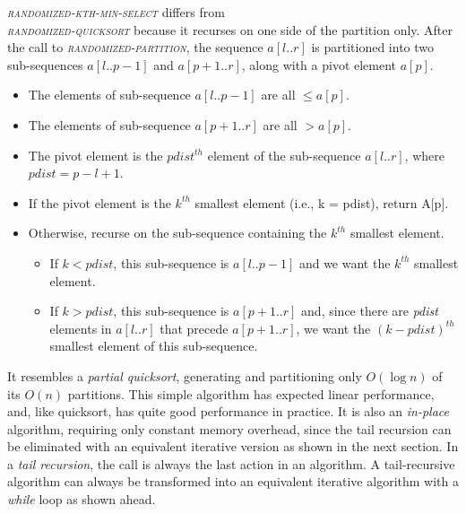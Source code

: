 \emph{\textsc{randomized-kth-min-select}} differs from\\ \emph{\textsc{randomized-quicksort}} because it recurses on one side of the partition only. After the call to \emph{\textsc{randomized-partition}}, the sequence $a[l..r]$ is partitioned into two sub-sequences $a[l..p - 1]$ and $a[p + 1..r]$, along with a pivot element $a[p]$.
\begin{itemize}
    \item The elements of sub-sequence $a[l..p - 1]$ are all $ \le a[p]$.
    \item The elements of sub-sequence $a[p + 1.. r]$ are all $ > a[p]$.
    \item The pivot element is the $pdist^{th}$ element of the sub-sequence $a[l..r]$, where $pdist = p − l + 1$.
    \item If the pivot element is the $k^{th}$ smallest element (i.e., k = pdist), return A[p].
    \item Otherwise, recurse on the sub-sequence containing the $k^{th}$ smallest element.
    \begin{itemize}
        \item If $k < pdist$, this sub-sequence is $a[l..p - 1]$ and we want the  $k^{th}$ smallest element.
        \item If $k > pdist$, this sub-sequence is $a[p + 1.. r]$ and, since there are \emph{pdist} elements in $a[l..r]$ that precede $a[p + 1.. r]$, we want the $(k - pdist)^{th}$ smallest element of this sub-sequence.
    \end{itemize}
\end{itemize}
It resembles a \emph{partial quicksort}, generating and partitioning only $O(\log n)$ of its $O(n)$ partitions. This simple algorithm has expected linear performance, and, like quicksort, has quite good performance in practice. It is also an \emph{in-place} algorithm, requiring only constant memory overhead, since the tail recursion can be eliminated with an equivalent iterative version as shown in the next section. In a \emph{tail recursion}, the call is always the last action in an algorithm. A tail-recursive algorithm can always be transformed into an equivalent iterative algorithm with a \emph{while} loop as shown ahead.

